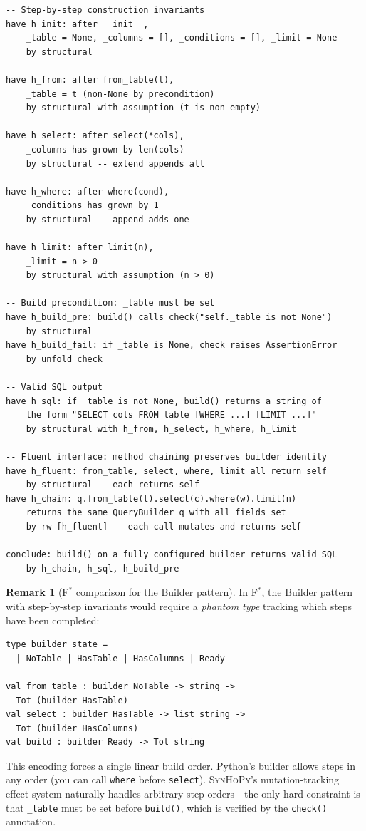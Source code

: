 \documentclass[11pt,a4paper]{report}
\theoremstyle{definition}
\newtheorem{remark}[definition]{Remark}
\theoremstyle{plain}
\newcommand{\fstar}{F$^{*}$}
\newcommand{\synhopy}{\textsc{SynHoPy}}
\begin{document}
\begin{lstlisting}[style=proof]
-- Step-by-step construction invariants
have h_init: after __init__,
    _table = None, _columns = [], _conditions = [], _limit = None
    by structural

have h_from: after from_table(t),
    _table = t (non-None by precondition)
    by structural with assumption (t is non-empty)

have h_select: after select(*cols),
    _columns has grown by len(cols)
    by structural -- extend appends all

have h_where: after where(cond),
    _conditions has grown by 1
    by structural -- append adds one

have h_limit: after limit(n),
    _limit = n > 0
    by structural with assumption (n > 0)

-- Build precondition: _table must be set
have h_build_pre: build() calls check("self._table is not None")
    by structural
have h_build_fail: if _table is None, check raises AssertionError
    by unfold check

-- Valid SQL output
have h_sql: if _table is not None, build() returns a string of
    the form "SELECT cols FROM table [WHERE ...] [LIMIT ...]"
    by structural with h_from, h_select, h_where, h_limit

-- Fluent interface: method chaining preserves builder identity
have h_fluent: from_table, select, where, limit all return self
    by structural -- each returns self
have h_chain: q.from_table(t).select(c).where(w).limit(n)
    returns the same QueryBuilder q with all fields set
    by rw [h_fluent] -- each call mutates and returns self

conclude: build() on a fully configured builder returns valid SQL
    by h_chain, h_sql, h_build_pre
\end{lstlisting}

\begin{remark}[\fstar{} comparison for the Builder pattern]
In \fstar{}, the Builder pattern with step-by-step invariants would
require a \emph{phantom type} tracking which steps have been completed:
\begin{lstlisting}[style=fstar]
type builder_state =
  | NoTable | HasTable | HasColumns | Ready

val from_table : builder NoTable -> string ->
  Tot (builder HasTable)
val select : builder HasTable -> list string ->
  Tot (builder HasColumns)
val build : builder Ready -> Tot string
\end{lstlisting}
This encoding forces a single linear build order.  Python's builder
allows steps in any order (you can call \lstinline[style=python]{where}
before \lstinline[style=python]{select}).  \synhopy{}'s mutation-tracking
effect system naturally handles arbitrary step orders---the only hard
constraint is that \lstinline[style=python]{_table} must be set before
\lstinline[style=python]{build()}, which is verified by the
\lstinline[style=synhopy]{check()} annotation.
\end{remark}
\end{document}
